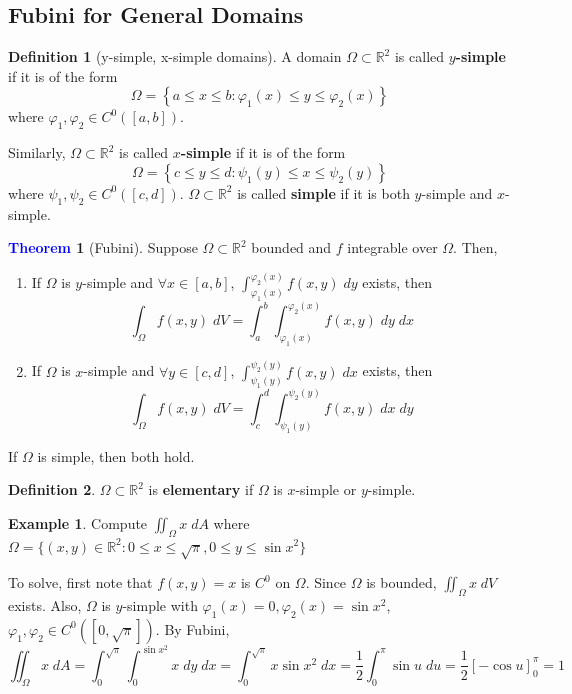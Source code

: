 \documentclass[11pt]{article}
\theoremstyle{definition}
\newtheorem{exmp}{Example}[section]
\theoremstyle{definition}
\newcommand{\R}[0]{\mathbb{R}}
\newtheorem{theorem}{\textcolor{blue}{Theorem}}
\theoremstyle{definition}
\newtheorem{definition}{\textcolor{OliveGreen}{Definition}}
\theoremstyle{remark}
\begin{document}
\subsection{Fubini for General Domains}

\begin{definition}[y-simple, x-simple domains]
    A domain $\Omega \subset \R^2$ is called \textbf{$y$-simple} if it is of the form
    \[
        \Omega = \left\{ a \leq x \leq b : \varphi_1(x) \leq y \leq \varphi_2(x) \right\} 
    \]   
    where $\varphi_1, \varphi_2 \in C^0([a,b])$.
    
    Similarly, $\Omega \subset \R^2$ is called \textbf{$x$-simple} if it is of the form
    \[
        \Omega = \left\{ c \leq y \leq d : \psi_1(y) \leq x \leq \psi_2(y) \right\} 
    \]    
    where $\psi_1, \psi_2 \in C^0([c,d])$.
    $\Omega \subset \R^2$ is called \textbf{simple} if it is both $y$-simple and $x$-simple. 
\end{definition}

\begin{theorem}[Fubini]
    Suppose $\Omega \subset \R^2$ bounded and $f$ integrable over $\Omega$. Then,
    \begin{enumerate}
        \item If $\Omega$ is $y$-simple and $\forall x \in [a,b]$, $\int_{\varphi_1(x)}^{\varphi_2(x)} f(x,y) \; dy$ exists, then
        \[
            \int_{\Omega} f(x,y) \; dV = \int_a^b \int_{\varphi_1(x)}^{\varphi_2(x)} f(x,y) \; dy \; dx
        \] 
        \item If $\Omega$ is $x$-simple and $\forall y \in [c,d]$, $\int_{\psi_1(y)}^{\psi_2(y)} f(x,y) \; dx$ exists, then
        \[
            \int_{\Omega} f(x,y) \; dV = \int_c^d \int_{\psi_1(y)}^{\psi_2(y)} f(x,y) \; dx \; dy
        \]     
    \end{enumerate} 
    If $\Omega$ is simple, then both hold. 
\end{theorem}

\begin{definition}
    $\Omega \subset \R^2$ is \textbf{elementary} if $\Omega$ is $x$-simple or $y$-simple.
\end{definition}

\begin{exmp}
    Compute $\iint_{\Omega} x \; dA$ where $\Omega = \{(x,y) \in \R^2 : 0 \leq x \leq \sqrt{\pi}, 0 \leq y \leq \sin x^2 \}$
    
    To solve, first note that $f(x,y) = x$ is $C^0$ on $\Omega$. Since $\Omega$ is bounded, $\iint_{\Omega} x \; dV$ exists. Also,
    $\Omega$ is $y$-simple with $\varphi_1(x) = 0, \varphi_2(x) = \sin x^2$, $\varphi_1, \varphi_2 \in C^0([0, \sqrt{\pi}])$.
    By Fubini,
    \[
        \iint_{\Omega} x \; dA = \int_0^{\sqrt{\pi}} \int_0^{\sin x^2} x \; dy \; dx = \int_0^{\sqrt{\pi}} x \sin x^2 \; dx = \frac{1}{2} \int_0^{\pi} \sin u \; du = \frac{1}{2} \left[ -\cos u \right]_0^{\pi} = 1
    \]     
\end{exmp}
\end{document}
